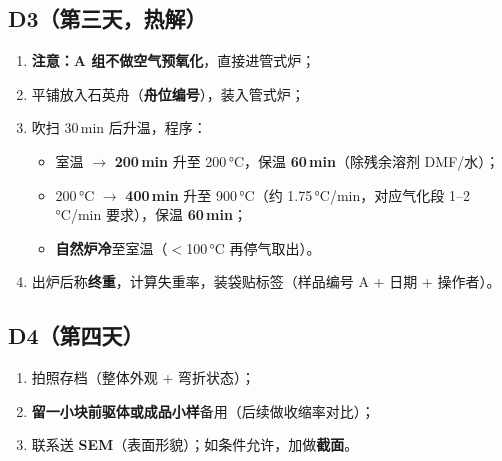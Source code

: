 \documentclass[a4paper, 11pt]{ctexart}
\begin{document}
\subsection*{D3（第三天，热解）}
\begin{enumerate}
  \item \textbf{注意：A 组不做空气预氧化}，直接进管式炉；
  \item 平铺放入石英舟（\textbf{舟位编号}），装入管式炉；
  \item {} 吹扫 30\,min 后升温，程序：
    \begin{itemize}
      \item 室温 $\rightarrow$ \textbf{200\,min} 升至 200\,°C，保温 \textbf{60\,min}（除残余溶剂 DMF/水）；
      \item 200\,°C $\rightarrow$ \textbf{400\,min} 升至 900\,°C（约 1.75\,°C/min，对应气化段 1--2\,°C/min 要求），保温 \textbf{60\,min}；
      \item \textbf{自然炉冷}至室温（$<$100\,°C 再停气取出）。
    \end{itemize}
  \item 出炉后称\textbf{终重}，计算失重率，装袋贴标签（样品编号 A + 日期 + 操作者）。
\end{enumerate}

\subsection*{D4（第四天）}
\begin{enumerate}
  \item 拍照存档（整体外观 + 弯折状态）；
  \item \textbf{留一小块前驱体或成品小样}备用（后续做收缩率对比）；
  \item 联系送 \textbf{SEM}（表面形貌）；如条件允许，加做\textbf{截面}。
\end{enumerate}
\end{document}

